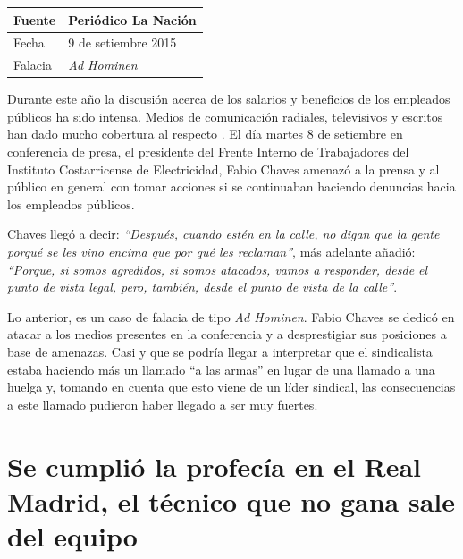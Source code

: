 \documentclass[times]{simauth}
\begin{document}
\newpage
\begin{table}[h!]
    \begin{tabular}{ll} 
        \toprule[1.5pt]
        Fuente & Periódico La Nación\\
        \midrule[0.5pt]
        Fecha  & 9 de setiembre 2015\\
        \midrule[0.5pt]
        Falacia & \textit{Ad Hominen} \\
        \bottomrule[1.5pt]
    \end{tabular} 
\end{table}

Durante este año la discusión acerca de los salarios y beneficios de los empleados públicos ha sido intensa. Medios de comunicación radiales, televisivos y escritos han dado mucho cobertura al respecto .
El día martes 8 de setiembre en conferencia de presa, el presidente del Frente Interno de Trabajadores del Instituto Costarricense de Electricidad, Fabio Chaves amenazó a la prensa y al público en general con tomar acciones si se continuaban haciendo denuncias hacia los empleados públicos.

Chaves llegó a decir: \textit{``Después, cuando estén en la calle, no digan que la gente porqué se les vino encima que por qué les reclaman''}, más adelante añadió: \textit{``Porque, si somos agredidos, si somos atacados, vamos a responder, desde el punto de vista legal, pero, también, desde el punto de vista de la calle''}.

Lo anterior, es un caso de falacia de tipo \textit{Ad Hominen}. Fabio Chaves se dedicó en atacar a los medios presentes en la conferencia y a desprestigiar sus posiciones a base de amenazas. Casi y que se podría llegar a interpretar que el sindicalista estaba haciendo más un llamado ``a las armas'' en lugar de una  llamado a una huelga y, tomando en cuenta que esto viene de un líder sindical, las consecuencias a este llamado pudieron haber llegado a ser muy fuertes. 

\newpage
\section{Se cumplió la profecía en el Real Madrid, el técnico que no gana sale del equipo}
\end{document}
